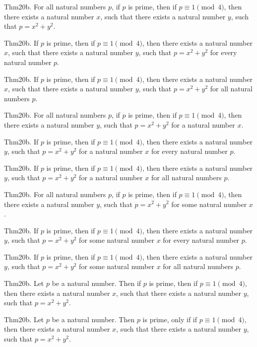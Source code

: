 \documentclass{article}
\begin{document}
Thm20b. For all natural numbers $p$, if $p$ is prime, then if $p \equiv 1 \pmod{ 4}$, then there exists a natural number $x$, such that there exists a natural number $y$, such that $p = x ^{ 2}+ y ^{ 2}$.

Thm20b. If $p$ is prime, then if $p \equiv 1 \pmod{ 4}$, then there exists a natural number $x$, such that there exists a natural number $y$, such that $p = x ^{ 2}+ y ^{ 2}$ for every natural number $p$.

Thm20b. If $p$ is prime, then if $p \equiv 1 \pmod{ 4}$, then there exists a natural number $x$, such that there exists a natural number $y$, such that $p = x ^{ 2}+ y ^{ 2}$ for all natural numbers $p$.

Thm20b. For all natural numbers $p$, if $p$ is prime, then if $p \equiv 1 \pmod{ 4}$, then there exists a natural number $y$, such that $p = x ^{ 2}+ y ^{ 2}$ for a natural number $x$.

Thm20b. If $p$ is prime, then if $p \equiv 1 \pmod{ 4}$, then there exists a natural number $y$, such that $p = x ^{ 2}+ y ^{ 2}$ for a natural number $x$ for every natural number $p$.

Thm20b. If $p$ is prime, then if $p \equiv 1 \pmod{ 4}$, then there exists a natural number $y$, such that $p = x ^{ 2}+ y ^{ 2}$ for a natural number $x$ for all natural numbers $p$.

Thm20b. For all natural numbers $p$, if $p$ is prime, then if $p \equiv 1 \pmod{ 4}$, then there exists a natural number $y$, such that $p = x ^{ 2}+ y ^{ 2}$ for some natural number $x$.

Thm20b. If $p$ is prime, then if $p \equiv 1 \pmod{ 4}$, then there exists a natural number $y$, such that $p = x ^{ 2}+ y ^{ 2}$ for some natural number $x$ for every natural number $p$.

Thm20b. If $p$ is prime, then if $p \equiv 1 \pmod{ 4}$, then there exists a natural number $y$, such that $p = x ^{ 2}+ y ^{ 2}$ for some natural number $x$ for all natural numbers $p$.

Thm20b. Let $p$ be a natural number. Then if $p$ is prime, then if $p \equiv 1 \pmod{ 4}$, then there exists a natural number $x$, such that there exists a natural number $y$, such that $p = x ^{ 2}+ y ^{ 2}$.

Thm20b. Let $p$ be a natural number. Then $p$ is prime, only if if $p \equiv 1 \pmod{ 4}$, then there exists a natural number $x$, such that there exists a natural number $y$, such that $p = x ^{ 2}+ y ^{ 2}$.
\end{document}
